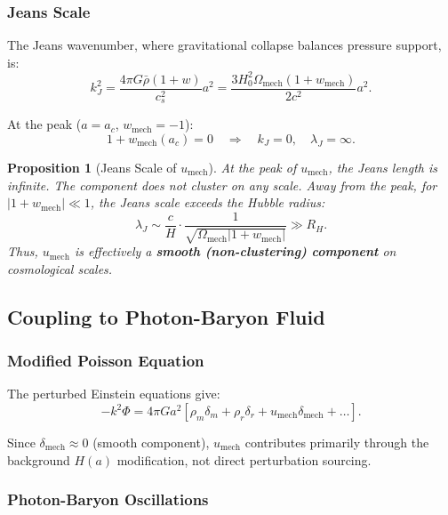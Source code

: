 \documentclass[11pt,a4paper]{article}
\newcommand{\umech}{\ensuremath{u_{\mathrm{mech}}}}
\newcommand{\wmech}{\ensuremath{w_{\mathrm{mech}}}}
\newcommand{\ac}{\ensuremath{a_c}}
\newtheorem{proposition}[theorem]{Proposition}
\theoremstyle{definition}
\theoremstyle{remark}
\begin{document}
\subsubsection{Jeans Scale}

The Jeans wavenumber, where gravitational collapse balances pressure support, is:
\begin{equation}
k_J^2 = \frac{4\pi G \bar{\rho}(1+w)}{c_s^2} a^2 = \frac{3H_0^2 \Omega_{\mathrm{mech}}(1+\wmech)}{2c^2} a^2.
\end{equation}

At the peak ($a = \ac$, $\wmech = -1$):
\begin{equation}
1 + \wmech(\ac) = 0 \quad \Rightarrow \quad k_J = 0, \quad \lambda_J = \infty.
\end{equation}

\begin{proposition}[Jeans Scale of $\umech$]
\label{prop:jeans_mech}
At the peak of $\umech$, the Jeans length is infinite. The component does not cluster on any scale. Away from the peak, for $|1+\wmech| \ll 1$, the Jeans scale exceeds the Hubble radius:
\begin{equation}
\lambda_J \sim \frac{c}{H} \cdot \frac{1}{\sqrt{\Omega_{\mathrm{mech}}|1+\wmech|}} \gg R_H.
\end{equation}
Thus, $\umech$ is effectively a \textbf{smooth (non-clustering) component} on cosmological scales.
\end{proposition}

\subsection{Coupling to Photon-Baryon Fluid}
\label{sec:coupling}

\subsubsection{Modified Poisson Equation}

The perturbed Einstein equations give:
\begin{equation}
\label{eq:poisson}
-k^2\Phi = 4\pi G a^2 \left[ \rho_m \delta_m + \rho_r \delta_r + \umech \delta_{\mathrm{mech}} + \ldots \right].
\end{equation}

Since $\delta_{\mathrm{mech}} \approx 0$ (smooth component), $\umech$ contributes primarily through the background $H(a)$ modification, not direct perturbation sourcing.

\subsubsection{Photon-Baryon Oscillations}
\end{document}

